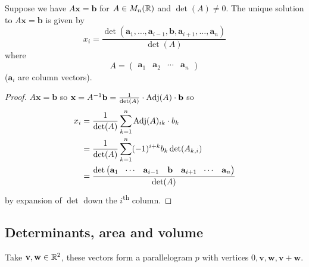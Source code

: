 \documentclass[10pt, a4paper]{article}
\newcommand{\mbf}[1]{\mathbf{#1}}
\newcommand{\ts}[1]{\textsuperscript{#1}}
\begin{document}
\begin{proposition}
    Suppose we have $A\mbf{x} = \mbf{b}$ for $A \in M_n(\mathbb{R})$ and $\det(A) \neq 0$.
    The unique solution to $A\mbf{x} = \mbf{b}$ is given by
    \[
    x_i = \frac{\det(\mbf{a}_1, \dotsc, \mbf{a}_{i - 1}, \mbf{b}, \mbf{a}_{i + 1}, \dotsc, \mbf{a}_n)}{\det(A)}
    \]
    where
    \[
    A = \begin{pmatrix}
        \mbf{a}_1 & \mbf{a}_2 & \dotsi & \mbf{a}_n
    \end{pmatrix}
    \]
    ($\mbf{a}_i$ are column vectors).
    \begin{proof}
        $A\mbf{x} = \mbf{b}$ so $\mbf{x} = A ^ {-1}\mbf{b} = \frac{1}{\det(A)}\cdot\Adj(A) \cdot \mbf{b}$
        so
        \begin{align*}
            x_i &= \frac{1}{\det(A)}\sum_{k = 1}^{n}\Adj(A)_{ik} \cdot b_k \\
            &= \frac{1}{\det(A)}\sum_{k = 1}^{n}(-1) ^ {i + k}b_k\det(A_{k, i}) \\
            &= \frac{\det\begin{pmatrix}
                \mbf{a}_1 & \dotsi & \mbf{a}_{i - 1} & \mbf{b} & \mbf{a}_{i + 1} & \dotsi & \mbf{a}_n
            \end{pmatrix}}{
            \det(A)}
        \end{align*}
        by expansion of $\det$ down the $i$\ts{th} column.
    \end{proof}
\end{proposition}

\subsection{Determinants, area and volume}

Take $\mbf{v, w} \in \R ^ 2$,
these vectors form a parallelogram $p$ with vertices $0, \mbf{v}, \mbf{w}, \mbf{v + w}$.
\end{document}
